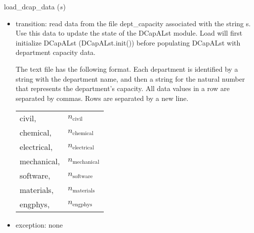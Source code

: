 \documentclass[12pt]{article}
\begin{document}
\noindent load\_dcap\_data ($s$)
\begin{itemize}
\item transition: read data from the file dept\_capacity associated with the string s.
  Use this data to update the state of the DCapALst module.  Load will first
  initialize DCapALst (DCapALst.init()) before populating DCapALst with
  department capacity data.

  The text file has the following format.  Each department is identified by a
  string with the department name, and then a string for the natural number that
  represents the department's capacity.  All data values in a row are
  separated by commas.  Rows are separated by a new line.

  \begin{tabular}{ll}
    civil, & $n_\text{civil}$\\
    chemical, & $n_\text{chemical}$\\
    electrical, & $n_\text{electrical}$\\
    mechanical, & $n_\text{mechanical}$\\
    software, & $n_\text{software}$\\
    materials, & $n_\text{materials}$\\
    engphys, & $n_\text{engphys}$\\
  \end{tabular}

\item exception: none
\end{itemize}
\end{document}
